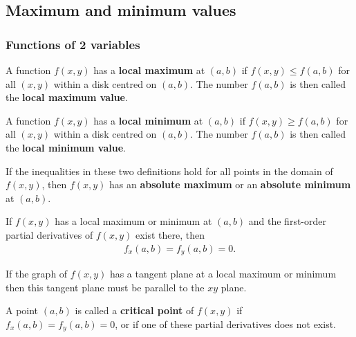 \documentclass{article}
\begin{document}
\subsection{Maximum and minimum values}


\subsubsection{Functions of 2 variables}

\begin{definition}
	A function $f(x,y)$ has a \textbf{local maximum} at $(a,b)$ if $f(x,y)\leq f(a,b)$
	for all $(x,y)$ within a disk centred on $(a,b)$. The number $f(a,b)$
	is then called the \textbf{local maximum value}.
\end{definition}
\begin{definition}
	A function $f(x,y)$ has a \textbf{local minimum} at $(a,b)$ if $f(x,y)\geq f(a,b)$
	for all $(x,y)$ within a disk centred on $(a,b)$. The number $f(a,b)$
	is then called the \textbf{local minimum value}.
\end{definition}
\begin{definition}
	If the inequalities in these two definitions hold for all points in the
	domain of $f(x,y)$, then $f(x,y)$ has an \textbf{absolute maximum} or an
	\textbf{absolute minimum} at $(a,b)$.
\end{definition}
\begin{theorem}
	If $f(x,y)$ has a local maximum or minimum at $(a,b)$ and the first-order
	partial derivatives of $f(x,y)$ exist there, then
	\begin{align*}
		f_x(a,b) = f_y(a,b) = 0.
	\end{align*}
\end{theorem}
\begin{lemma}
	If the graph of $f(x,y)$ has a tangent plane at a local maximum or minimum
	then this tangent plane must be parallel to the $xy$ plane.
\end{lemma}
\begin{definition}
	A point $(a,b)$ is called a \textbf{critical point} of $f(x,y)$ if
	$f_x(a,b)=f_y(a,b)=0$, or if one of these partial derivatives does not exist.
\end{definition}
\end{document}
